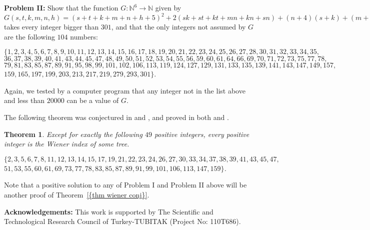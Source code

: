 \documentclass[12pt]{amsart}
\newtheorem{theorem}{Theorem}[section]
\theoremstyle{example}
\theoremstyle{definition}
\theoremstyle{notation}
\begin{document}
\textbf{Problem II:} Show that
the function $G:{{\mathbb N}}^6 \longrightarrow {{\mathbb N}}$ given by
$G(s,t,k,m,n,h)=(s+t+k+m+n+h+5)^2+2(sk+st+kt+mn+kn+sn)+(n+4)(s+k)+(m+2)(s+k+t+2)+n(t+6)+h(3s+3k+2n+2m+t+6) $
takes every integer bigger than $301$, and that the only integers not assumed by $G$ are the following $104$ numbers:

\footnotesize
$\{1,2,3,4,5,6,7,8,9,10,11,12,13,14,15,16,17,18,19,20,21,22,23,24,25,26,27,28,30,31, 32,33,34,35, \quad$ $36,37,38,39,40,41,43,44,45,47,48,49,50,51,52,53,54,55,56,59,60,61,64,66,69,70,71,72,73,75,77,78, \quad$ $79,81,83,85,87,89,91,95,98,99,101,102,106,113,119,124,127,129,131,133,135,139,141,143,147,149,157, \qquad $ $159,165,197,199,203,213,217,219,279,293,301\}$.
\normalsize

Again, we tested by a computer program that any integer not in the list above and less than $20000$ can be a value of $G$.

The following theorem was conjectured in \cite{LG} and \cite{GY}, and proved in both \cite{WY} and \cite{W}.
\begin{theorem}\label{thm wiener conj}
Except for exactly the following $49$ positive integers, every positive integer is the Wiener
index of some tree.

$\{2, 3, 5, 6, 7, 8, 11, 12, 13, 14, 15, 17, 19, 21, 22, 23, 24, 26, 27, 30, 33, 34, 37, 38, 39, 41,
43, 45, 47,$
$ 51, 53, 55, 60, 61, 69, 73, 77, 78, 83, 85, 87, 89, 91, 99, 101, 106, 113, 147,
159 \}$.
\end{theorem}

Note that a positive solution to any of Problem I and Problem II above will be another proof of {Theorem~\ref{{thm wiener conj}}}.

\textbf{Acknowledgements:} This work is supported by The Scientific and Technological Research Council of Turkey-TUBITAK (Project No: 110T686).
\end{document}
